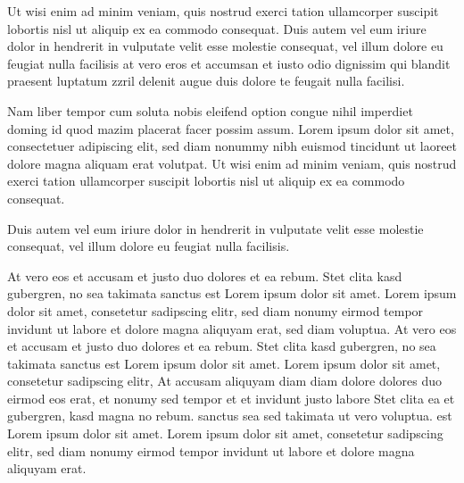 \documentclass{article}
\begin{document}
Ut wisi enim ad minim veniam, quis nostrud exerci tation ullamcorper suscipit lobortis nisl ut aliquip ex ea commodo
consequat. Duis autem vel eum iriure dolor in hendrerit in vulputate velit esse molestie consequat, vel illum dolore
eu feugiat nulla facilisis at vero eros et accumsan et iusto odio dignissim qui blandit praesent luptatum zzril
delenit augue duis dolore te feugait nulla facilisi.

Nam liber tempor cum soluta nobis eleifend option congue nihil imperdiet doming id quod mazim placerat facer possim
assum. Lorem ipsum dolor sit amet, consectetuer adipiscing elit, sed diam nonummy nibh euismod tincidunt ut laoreet
dolore magna aliquam erat volutpat. Ut wisi enim ad minim veniam, quis nostrud exerci tation ullamcorper suscipit
lobortis nisl ut aliquip ex ea commodo consequat.

Duis autem vel eum iriure dolor in hendrerit in vulputate velit esse molestie consequat, vel illum dolore eu feugiat
nulla facilisis.

At vero eos et accusam et justo duo dolores et ea rebum. Stet clita kasd gubergren, no sea takimata sanctus est Lorem
ipsum dolor sit amet. Lorem ipsum dolor sit amet, consetetur sadipscing elitr, sed diam nonumy eirmod tempor invidunt
ut labore et dolore magna aliquyam erat, sed diam voluptua. At vero eos et accusam et justo duo dolores et ea rebum.
Stet clita kasd gubergren, no sea takimata sanctus est Lorem ipsum dolor sit amet. Lorem ipsum dolor sit amet,
consetetur sadipscing elitr, At accusam aliquyam diam diam dolore dolores duo eirmod eos erat, et nonumy sed tempor
et et invidunt justo labore Stet clita ea et gubergren, kasd magna no rebum. sanctus sea sed takimata ut vero
voluptua. est Lorem ipsum dolor sit amet. Lorem ipsum dolor sit amet, consetetur sadipscing elitr, sed diam nonumy
eirmod tempor invidunt ut labore et dolore magna aliquyam erat.
\end{document}
